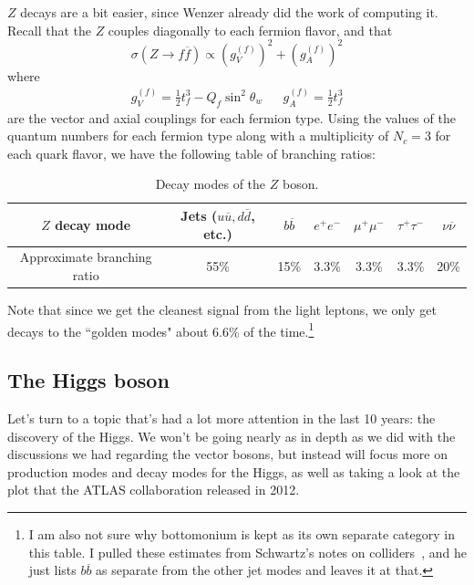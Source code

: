 \documentclass[11pt, oneside]{article}   	%
\theoremstyle{definition}
\numberwithin{equation}{subsection}		%
\begin{document}
$Z$ decays are a bit easier, since Wenzer already did the work of computing it. Recall that the $Z$ couples diagonally to each fermion flavor, 
and that
\begin{equation}
	\sigma(Z\rightarrow f\overline f)\propto (g_V^{(f)})^2 + (g_A^{(f)})^2
\end{equation}
where 
\begin{align}
	g_V^{(f)} = \frac{1}{2} t^3_f - Q_f\sin^2\theta_w && g_A^{(f)} = \frac{1}{2} t^3_f
\end{align}
are the vector and axial couplings for each fermion type. Using the values of the quantum numbers for each fermion type along with a 
multiplicity of $N_c = 3$ for each quark flavor, we have the following table of branching ratios:
\begin{table}[H]
	\centering
	\begin{tabular}{ | c | c | c | c | c | c | c |}
		\hline
		$Z$ decay mode & Jets ($u\overline u, d\overline d$, etc.) & $b\overline b$ & $e^+e^-$ & $\mu^+\mu^-$ & $\tau^+\tau^-$ & $\nu\overline\nu$ \\
		\hline
		Approximate branching ratio & 55\% & 15\% & 3.3\% & 3.3\% & 3.3\% & 20\% \\
		\hline
	\end{tabular}
	\caption{Decay modes of the $Z$ boson.}
	\label{table:z_decay}
\end{table}
Note that since we get the cleanest signal from the light leptons, we only get decays to the ``golden modes" about 6.6\% of the 
time.\footnote{I am also not sure why bottomonium is kept as its own separate category in this table. I pulled these estimates from Schwartz's notes on colliders~\cite{schwartz}, and he just lists $b\overline b$ as separate from the other jet modes and leaves it at that.}

\subsection{The Higgs boson}

Let's turn to a topic that's had a lot more attention in the last 10 years: the discovery of the Higgs. We won't be going nearly as in depth as 
we did with the discussions we had regarding the vector bosons, but instead will focus more on production modes and decay modes for 
the Higgs, as well as taking a look at the plot that the ATLAS collaboration released in 2012. 
\end{document}
